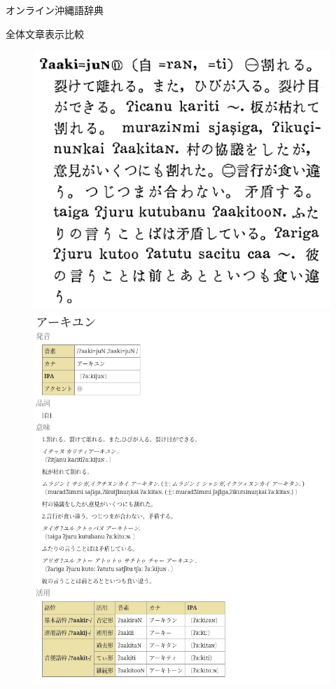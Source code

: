 \documentclass[14pt]{beamer}
\begin{document}
\begin{frame}{オンライン沖縄語辞典}
  \begin{block}{全体文章表示比較}
    \begin{figure}[ht]
      \centering
      \begin{minipage}{0.5\textwidth}
        \includegraphics[height=0.5\paperheight,width=0.4\paperwidth]{oki-dict-example-aakiyun-original.png}
      \end{minipage}%
      \begin{minipage}{0.5\textwidth}
        \includegraphics[height=0.65\paperheight]{oki-dict-example-aakiyun-online.png}

\end{minipage}
\end{figure}
\end{block}
\end{frame}
\end{document}
